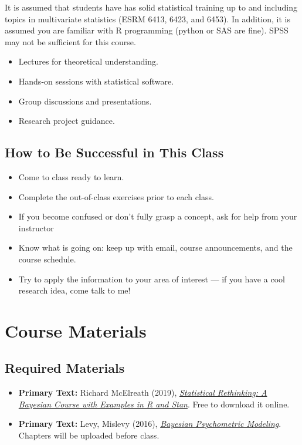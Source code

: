 \documentclass[
  letterpaper,
  DIV=11,
  numbers=noendperiod]{scrartcl}
\providecommand{\tightlist}{%
  \setlength{\itemsep}{0pt}\setlength{\parskip}{0pt}}\usepackage{longtable,booktabs,array}
\begin{document}
It is assumed that students have has solid statistical training up to
and including topics in multivariate statistics (ESRM 6413, 6423, and
6453). In addition, it is assumed you are familiar with R programming
(python or SAS are fine). SPSS may not be sufficient for this course.

\begin{itemize}
\tightlist
\item
  Lectures for theoretical understanding.
\item
  Hands-on sessions with statistical software.
\item
  Group discussions and presentations.
\item
  Research project guidance.
\end{itemize}

\hypertarget{how-to-be-successful-in-this-class}{%
\subsection{How to Be Successful in This
Class}\label{how-to-be-successful-in-this-class}}

\begin{itemize}
\tightlist
\item
  Come to class ready to learn.
\item
  Complete the out-of-class exercises prior to each class.
\item
  If you become confused or don't fully grasp a concept, ask for help
  from your instructor
\item
  Know what is going on: keep up with email, course announcements, and
  the course schedule.
\item
  Try to apply the information to your area of interest --- if you have
  a cool research idea, come talk to me!
\end{itemize}

\hypertarget{course-materials}{%
\section{Course Materials}\label{course-materials}}

\hypertarget{required-materials}{%
\subsection{Required Materials}\label{required-materials}}

\begin{itemize}
\tightlist
\item
  \textbf{Primary Text:} Richard McElreath (2019),
  \href{https://github.com/Booleans/statistical-rethinking/blob/master/Statistical\%20Rethinking\%202nd\%20Edition.pdf}{\emph{Statistical
  Rethinking: A Bayesian Course with Examples in R and Stan}}. Free to
  download it online.
\item
  \textbf{Primary Text:} Levy, Mislevy (2016),
  \href{https://www.routledge.com/Bayesian-Psychometric-Modeling/Levy-Mislevy/p/book/9780367737092}{\emph{Bayesian
  Psychometric Modeling}}. Chapters will be uploaded before class.
\end{itemize}
\end{document}
